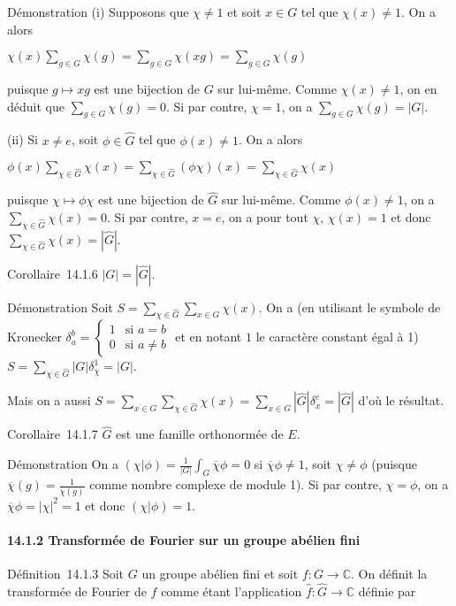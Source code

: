 Démonstration (i) Supposons que $\chi \neq 1$ et soit $x
\in G$ tel que $\chi(x) \neq 1$. On a alors

$\chi(x) \sum_{g \in G} \chi(g) =
\sum_{g \in G} \chi(xg) =
\sum_{g \in G} \chi(g)$

puisque $g \mapsto xg$ est une bijection de $G$ sur lui-même. Comme $\chi(x) \neq 1$, on en déduit que
$\sum_{g \in G} \chi(g) = 0$. Si par contre, $\chi = 1$, on a
$\sum_{g \in G} \chi(g) = |G|$.

(ii) Si $x \neq e$, soit $\phi \in \hat{G}$ tel que $\phi(x) \neq 1$. On a alors

$\phi(x) \sum_{\chi \in \hat{G}} \chi(x)
= \sum_{\chi \in \hat{G}}(\phi\chi)(x) =
\sum_{\chi \in \hat{G}} \chi(x)$

puisque $\chi \mapsto \phi\chi$ est une bijection de
$\hat{G}$ sur lui-même. Comme
$\phi(x) \neq 1$, on a
$\sum_{\chi \in \hat{G}} \chi(x) = 0$. Si par contre, $x = e$, on a
pour tout $\chi$, $\chi(x) = 1$ et donc
$\sum_{\chi \in \hat{G}} \chi(x) = |\hat{G}|$.

Corollaire~14.1.6 $|G| = |\hat{G}|$.

Démonstration Soit $S = \sum_{\chi \in \hat{G}} \sum_{x \in G} \chi(x)$. On a (en utilisant le
symbole de Kronecker $\delta_a^b = \begin{cases}
1 & \text{si } a = b \\
0 & \text{si } a \neq b
\end{cases}$ et en notant $1$ le caractère constant égal à 1) 
$S = \sum_{\chi \in \hat{G}} |G| \delta_\chi^1 = |G|$. 

Mais on a aussi $S = \sum_{x \in G} \sum_{\chi \in \hat{G}} \chi(x)
= \sum_{x \in G} |\hat{G}| \delta_x^e
= |\hat{G}|$ d'où le résultat.

Corollaire~14.1.7 $\hat{G}$ est une famille orthonormée
de $E$.

Démonstration On a $(\chi | \phi) = \frac{1}{|G|} \int_G \overline{\chi}\phi = 0$ si
$\overline{\chi}\phi \neq 1$, soit
$\chi \neq \phi$ (puisque $\overline{\chi}(g) = \frac{1}{\chi(g)}$ comme nombre complexe de module 1). Si
par contre, $\chi = \phi$, on a $\overline{\chi}\phi =
|\chi|^2 = 1$ et donc
$(\chi|\phi) = 1$.

\paragraph{14.1.2 Transformée de Fourier sur un groupe abélien fini}

Définition~14.1.3 Soit $G$ un groupe abélien fini et soit $f : G \rightarrow \mathbb{C}$. On
définit la transformée de Fourier de $f$ comme étant l'application
$\hat{f} : \hat{G} \rightarrow \mathbb{C}$ définie par

